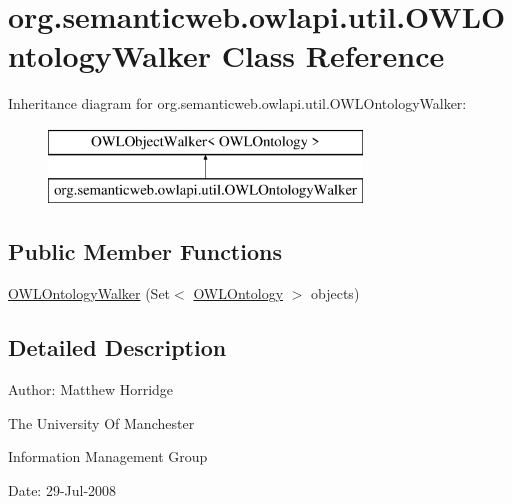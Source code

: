 \hypertarget{classorg_1_1semanticweb_1_1owlapi_1_1util_1_1_o_w_l_ontology_walker}{\section{org.\-semanticweb.\-owlapi.\-util.\-O\-W\-L\-Ontology\-Walker Class Reference}
\label{classorg_1_1semanticweb_1_1owlapi_1_1util_1_1_o_w_l_ontology_walker}
}
Inheritance diagram for org.\-semanticweb.\-owlapi.\-util.\-O\-W\-L\-Ontology\-Walker\-:\begin{figure}[H]
\begin{center}
\leavevmode
\includegraphics[height=2.000000cm]{classorg_1_1semanticweb_1_1owlapi_1_1util_1_1_o_w_l_ontology_walker}
\end{center}
\end{figure}
\subsection*{Public Member Functions}
\begin{DoxyCompactItemize}
\item 
\hyperlink{classorg_1_1semanticweb_1_1owlapi_1_1util_1_1_o_w_l_ontology_walker_ae59275501791ea3a921e11f337320bde}{O\-W\-L\-Ontology\-Walker} (Set$<$ \hyperlink{interfaceorg_1_1semanticweb_1_1owlapi_1_1model_1_1_o_w_l_ontology}{O\-W\-L\-Ontology} $>$ objects)
\end{DoxyCompactItemize}


\subsection{Detailed Description}
Author\-: Matthew Horridge\par
 The University Of Manchester\par
 Information Management Group\par
 Date\-: 29-\/\-Jul-\/2008\par
\par
 

